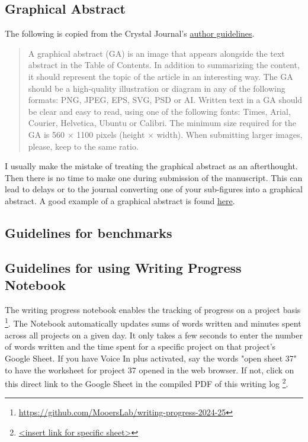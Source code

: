 \documentclass[11pt,letterpaper]{article}
\begin{document}
\subsection{Graphical Abstract}
\label{sec:org90c10fd}

The following is copied from the Crystal Journal's
\href{https://www.mdpi.com/journal/crystals/instructions\#preparation}{author
guidelines}.

\begin{quote}
A graphical abstract (GA) is an image that appears alongside the text
abstract in the Table of Contents. In addition to summarizing the
content, it should represent the topic of the article in an interesting
way. The GA should be a high-quality illustration or diagram in any of
the following formats: PNG, JPEG, EPS, SVG, PSD or AI. Written text in a
GA should be clear and easy to read, using one of the following fonts:
Times, Arial, Courier, Helvetica, Ubuntu or Calibri. The minimum size
required for the GA is 560 \(\times\) 1100 pixels (height \(\times\)
width). When submitting larger images, please, keep to the same ratio.
\end{quote}

I usually make the mistake of treating the graphical abstract as an
afterthought. Then there is no time to make one during submission of the
manuscript. This can lead to delays or to the journal converting one of
your sub-figures into a graphical abstract. A good example of a
graphical abstract is found
\href{https://www.mdpi.com/2073-4352/11/3/273}{here}.


\subsection{Guidelines for benchmarks}
\label{sec:org0273714}


\subsection{Guidelines for using Writing Progress Notebook}
\label{sec:org2c19ce5}

The writing progress notebook enables the tracking of progress on a
project basis \footnote{\url{https://github.com/MooersLab/writing-progress-2024-25}}. The Notebook automatically updates sums of words
written and minutes spent across all projects on a given day. It only
takes a few seconds to enter the number of words written and the time
spent for a specific project on that project's Google Sheet. If you have
Voice In plus activated, say the words "open sheet 37" to have the
worksheet for project 37 opened in the web browser. If not, click on
this direct link to the Google Sheet in the compiled PDF of this writing
log \footnote{\href{<insert link for specific sheet>}{<insert link for specific sheet>}}.
\end{document}
